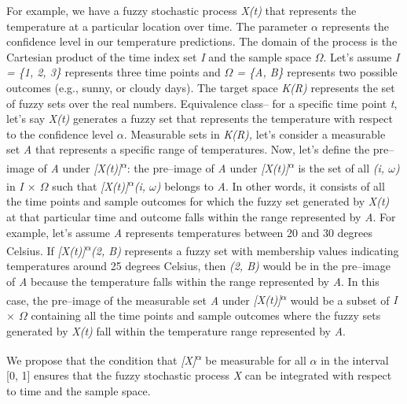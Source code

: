 \documentclass[12pt,a4paper]{report}
\numberwithin{equation}{section}
\begin{document}
For example, we have a fuzzy stochastic process \emph{X(t)} that
represents the temperature at a particular location over time. The
parameter $\alpha$ represents the confidence level in our temperature
predictions. The domain of the process is the Cartesian product of the
time index set \emph{I} and the sample space \emph{$\Omega$}. Let's assume
\emph{I = \{1, 2, 3\}} represents three time points and \emph{$\Omega$ = \{A,
B\}} represents two possible outcomes (e.g., sunny, or cloudy days). The
target space \emph{K(R)} represents the set of fuzzy sets over the real
numbers. Equivalence class-- for a specific time point \emph{t}, let's
say \emph{X(t)} generates a fuzzy set that represents the temperature
with respect to the confidence level \emph{$\alpha$}. Measurable sets in
\emph{K(R),} let's consider a measurable set \emph{A} that represents a
specific range of temperatures. Now, let's define the pre--image of
\emph{A} under \emph{{[}X(t){]}\textsuperscript{$\alpha$}}: the pre--image of
\emph{A} under \emph{{[}X(t){]}\textsuperscript{$\alpha$}} is the set of all
\emph{(i, $\omega$)} in \emph{I $\times$ $\Omega$} such that
\emph{{[}X(t){]}\textsuperscript{$\alpha$}(i, $\omega$)} belongs to \emph{A}. In other
words, it consists of all the time points and sample outcomes for which
the fuzzy set generated by \emph{X(t)} at that particular time and
outcome falls within the range represented by \emph{A}. For example,
let's assume \emph{A} represents temperatures between 20 and 30 degrees
Celsius. If \emph{{[}X(t){]}\textsuperscript{$\alpha$}(2, B)} represents a
fuzzy set with membership values indicating temperatures around 25
degrees Celsius, then \emph{(2, B)} would be in the pre--image of
\emph{A} because the temperature falls within the range represented by
\emph{A}. In this case, the pre--image of the measurable set \emph{A}
under \emph{{[}X(t){]}\textsuperscript{$\alpha$}} would be a subset of \emph{I
$\times$ $\Omega$} containing all the time points and sample outcomes where the fuzzy
sets generated by \emph{X(t)} fall within the temperature range
represented by \emph{A}.

We propose that the condition that \emph{{[}X{]}\textsuperscript{$\alpha$}} be
measurable for all \emph{$\alpha$} in the interval {[}0, 1{]} ensures that the
fuzzy stochastic process \emph{X} can be integrated with respect to time
and the sample space.
\end{document}

